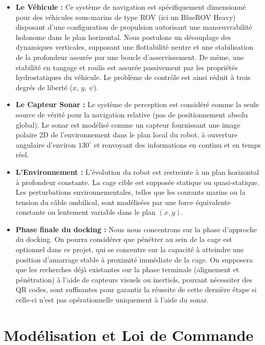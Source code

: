 \begin{itemize}
    \item \textbf{Le Véhicule :} Ce système de navigation est spécifiquement dimensionné pour des véhicules sous-marins de type ROV (ici un BlueROV Heavy) disposant d'une configuration de propulsion autorisant une manœuvrabilité holonome dans le plan horizontal. Nous postulons un découplage des dynamiques verticales, supposant une flottabilité neutre et une stabilisation de la profondeur assurée par une boucle d'asservissement. De même, une stabilité en tangage et roulis est assurée passivement par les propriétés hydrostatiques du véhicule. Le problème de contrôle est ainsi réduit à trois degrés de liberté ($x$, $y$, $\psi$). 
    \item \textbf{Le Capteur Sonar :} Le système de perception est considéré comme la seule source de vérité pour la navigation relative (pas de positionnement absolu global). Le sonar est modélisé comme un capteur fournissant une image polaire 2D de l'environnement dans le plan local du robot, à ouverture angulaire d'environ $130^{\circ}$ et renvoyant des informations en continu et en temps réel.
    \item \textbf{L'Environnement :} L'évolution du robot est restreinte à un plan horizontal à profondeur constante. La cage cible est supposée statique ou quasi-statique. Les perturbations environnementales, telles que les courants marins ou la tension du câble ombilical, sont modélisées par une force équivalente constante ou lentement variable dans le plan $(x,y)$.
    \item \textbf{Phase finale du docking :} Nous nous concentrons sur la phase d'approche du docking. On pourra considérer que pénétrer au sein de la cage est optionnel dans ce projet, qui se concentre sur la capacité à atteindre une position d'amarrage stable à proximité immédiate de la cage. On supposera que les recherches déjà existantes sur la phase terminale (alignement et pénétration) à l'aide de capteurs visuels ou inertiels, pouvant nécessiter des QR codes, sont suffisantes pour garantir la réussite de cette dernière étape si celle-ci n'est pas opérationnelle uniquement à l'aide du sonar. 
\end{itemize}




\section{Modélisation et Loi de Commande}

